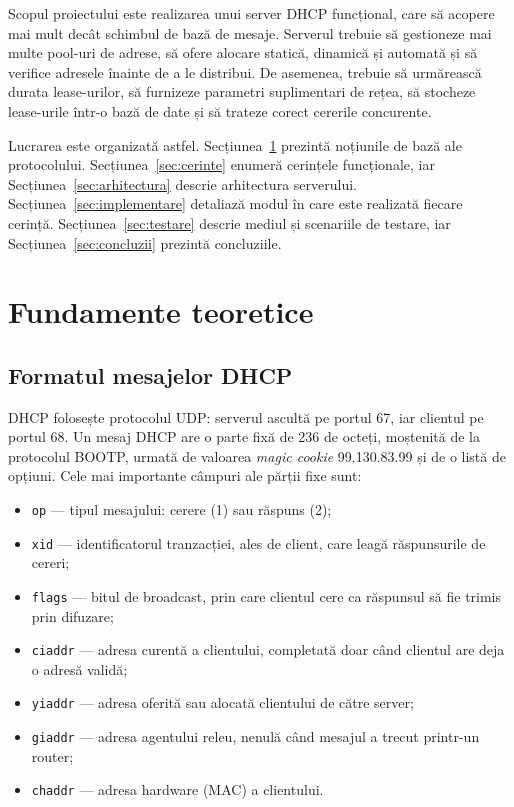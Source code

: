 \documentclass[conference]{IEEEtran}
\begin{document}
Scopul proiectului este realizarea unui server DHCP funcțional, care să acopere mai mult decât schimbul de bază de mesaje. Serverul trebuie să gestioneze mai multe pool-uri de adrese, să ofere alocare statică, dinamică și automată și să verifice adresele înainte de a le distribui. De asemenea, trebuie să urmărească durata lease-urilor, să furnizeze parametri suplimentari de rețea, să stocheze lease-urile într-o bază de date și să trateze corect cererile concurente.

Lucrarea este organizată astfel. Secțiunea~\ref{sec:fundamente} prezintă noțiunile de bază ale protocolului. Secțiunea~\ref{sec:cerinte} enumeră cerințele funcționale, iar Secțiunea~\ref{sec:arhitectura} descrie arhitectura serverului. Secțiunea~\ref{sec:implementare} detaliază modul în care este realizată fiecare cerință. Secțiunea~\ref{sec:testare} descrie mediul și scenariile de testare, iar Secțiunea~\ref{sec:concluzii} prezintă concluziile.

\section{Fundamente teoretice}\label{sec:fundamente}

\subsection{Formatul mesajelor DHCP}
DHCP folosește protocolul UDP: serverul ascultă pe portul 67, iar clientul pe portul 68. Un mesaj DHCP are o parte fixă de 236 de octeți, moștenită de la protocolul BOOTP, urmată de valoarea \textit{magic cookie} 99.130.83.99 și de o listă de opțiuni. Cele mai importante câmpuri ale părții fixe sunt:
\begin{itemize}
\item \texttt{op} --- tipul mesajului: cerere (1) sau răspuns (2);
\item \texttt{xid} --- identificatorul tranzacției, ales de client, care leagă răspunsurile de cereri;
\item \texttt{flags} --- bitul de broadcast, prin care clientul cere ca răspunsul să fie trimis prin difuzare;
\item \texttt{ciaddr} --- adresa curentă a clientului, completată doar când clientul are deja o adresă validă;
\item \texttt{yiaddr} --- adresa oferită sau alocată clientului de către server;
\item \texttt{giaddr} --- adresa agentului releu, nenulă când mesajul a trecut printr-un router;
\item \texttt{chaddr} --- adresa hardware (MAC) a clientului.
\end{itemize}
\end{document}
